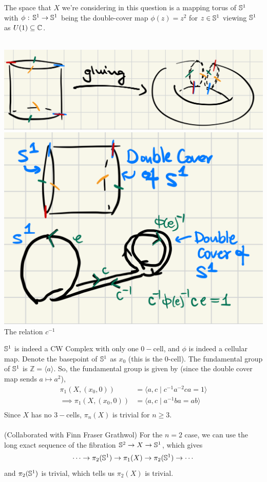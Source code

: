 \documentclass[11pt]{article}
\begin{document}
The space that $X$ we're considering in this question is a mapping torus of $\mathbb{S}^{1}$ with $\phi \text{ : } \mathbb{S}^{1} \rightarrow \mathbb{S}^{1}$ being the double-cover map $\phi(z) = z^2$ for $z \in \mathbb{S}^1$ viewing $\mathbb{S}^{1}$ as $U(1) \subseteq \mathbb{C}$.
\\
\\
\begin{center}
  \includegraphics*[scale=0.15]{Double-cover-21 5A -HW4-Q2.png}
  \includegraphics*[scale=0.25]{Extra-relation-fund-grp-of-mapping-space.png}  \\
  The relation $c^{-1}$ 
\end{center}
$\mathbb{S}^{1}$ is indeed a CW Complex with only one $0-$cell, and $\phi$ is indeed a cellular map. Denote the basepoint of $\mathbb{S}^1$ as $x_0$ (this is the $0$-cell). The fundamental group of $\mathbb{S}^{1}$ is $\mathbb{Z} = \langle a \rangle$. So, the fundamental group is given by (since the double cover map sends $a \mapsto a^2$),
\begin{align*}
  \pi_1(X, (x_0, 0)) &= \Big\langle a, c \;\Big|\; c^{-1}a^{-2}ca = 1 \Big\rangle \\
  \implies \pi_1(X, (x_0, 0)) &= \Big\langle a, c \;\Big|\; a^{-1}ba = ab \Big\rangle \\
\end{align*} Since $X$ has no $3-$cells, $\pi_n(X)$ is trivial for $n \geq 3$. 
\\
\\
(Collaborated with Finn Fraser Grathwol) For the $n = 2$ case, we can use the long exact sequence of the fibration $\mathbb{S}^2 \rightarrow X \rightarrow \mathbb{S}^1$, which gives 
$$ \cdots \rightarrow \pi_2(\mathbb{S}^1) \rightarrow \pi_1(X) \rightarrow \pi_2(\mathbb{S}^1) \rightarrow \cdots $$ and $\pi_2(\mathbb{S}^1)$ is trivial, which tells us $\pi_2(X)$ is trivial. 
\end{document}
